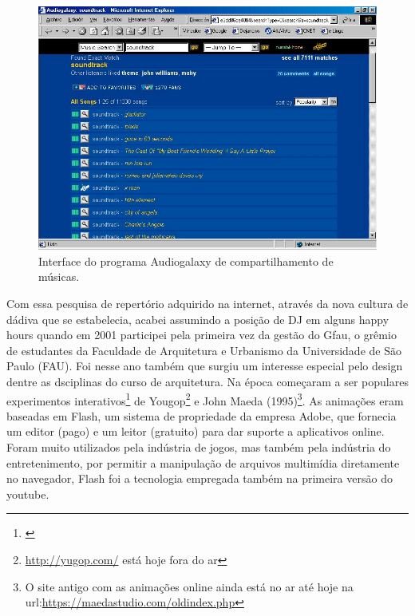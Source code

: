 \begin{figure}

\includegraphics[width=1\textwidth]{pictures/cap1/audiogalaxy}
\caption{Interface do programa Audiogalaxy de compartilhamento de músicas.}
\label{fig:audiogalaxy}
\end{figure}


Com essa pesquisa de repertório adquirido na internet, através da nova cultura de dádiva que se estabelecia, acabei assumindo a posição de DJ em alguns happy hours quando em 2001 participei pela primeira vez da gestão do Gfau, o grêmio de estudantes da Faculdade de Arquitetura e Urbanismo da Universidade de São Paulo (FAU). Foi nesse ano também que surgiu um interesse especial pelo design dentre as dsciplinas do curso de arquitetura. Na época começaram a ser populares experimentos interativos\footnote{\cite{Pindado2005}} de Yougop\footnote{\url{http://yugop.com/} está hoje fora do ar} e John Maeda (1995)\footnote{O site antigo com as animações online ainda está no ar até hoje na url:\url{https://maedastudio.com/oldindex.php}}. As animações eram baseadas em Flash, um sistema de propriedade da empresa Adobe, que fornecia um editor (pago) e um leitor (gratuito) para dar suporte a aplicativos online. Foram muito utilizados pela indústria de jogos, mas também pela indústria do entretenimento, por permitir a manipulação de arquivos multimídia diretamente no navegador, Flash foi a tecnologia empregada também na primeira versão do youtube. 


